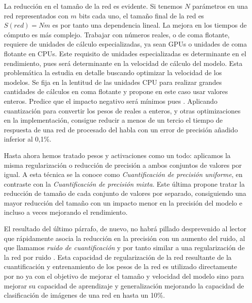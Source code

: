 La reducción en el tamaño de la red es evidente. Si tenemos $N$ parámetros en una red representados con $m$ bits cada uno, el tamaño final de la red es $S(red)=Nm$ es por tanto una dependencia lineal. La mejora en los tiempos de cómputo es más complejo. Trabajar con números reales, o de coma flotante, requiere de unidades de cálculo especializadas, ya sean GPUs o unidades de coma flotante en CPUs. Este requisito de unidades especializadas es determinante en el rendimiento, pues será determinante en la velocidad de cálculo del modelo. Esta problemática la estudia en detalle  buscando optimizar la velocidad de los modelos. Se fija en la lentitud de las unidades CPU para realizar grandes cantidades de cálculos en coma flotante y propone en este caso usar valores enteros. Predice que el impacto negativo será mínimos pues . Aplicando cuantización para convertir los pesos de reales a enteros, y otras optimizaciones en la implementación, consigue reducir a menos de un tercio el tiempo de respuesta de una red de procesado del habla con un error de precisión añadido inferior al 0,1\%.

Hasta ahora hemos tratado pesos y activaciones como un todo: aplicamos la misma regularización o reducción de precisión a ambos conjuntos de valores por igual. A esta técnica se la conoce como \textit{Cuantificación de precisión uniforme}, en contraste con la \textit{Cuantificación de precisión mixta}. Este última propone tratar la reducción de tamaño de cada conjunto de valores por separado, consiguiendo una mayor reducción del tamaño con un impacto menor en la precisión del modelo \cite{Jin2019} e incluso a veces mejorando el rendimiento.

El resultado del último párrafo, de nuevo, no habrá pillado desprevenido al lector que rápidamente asocia la reducción en la precisión con un aumento del ruido, al que llamamos \textit{ruido de cuantificación} y por tanto similar a una regularización de la red por ruido \cite{Bishop1995,Noh2017}. Esta capacidad de regularización de la red resultante de la cuantificación y entrenamiento de los pesos de la red es utilizado directamente por  no ya con el objetivo de mejorar el tamaño y velocidad del modelo sino para mejorar su capacidad de aprendizaje y generalización mejorando la capacidad de clasificación de imágenes de una red en hasta un 10\%.

